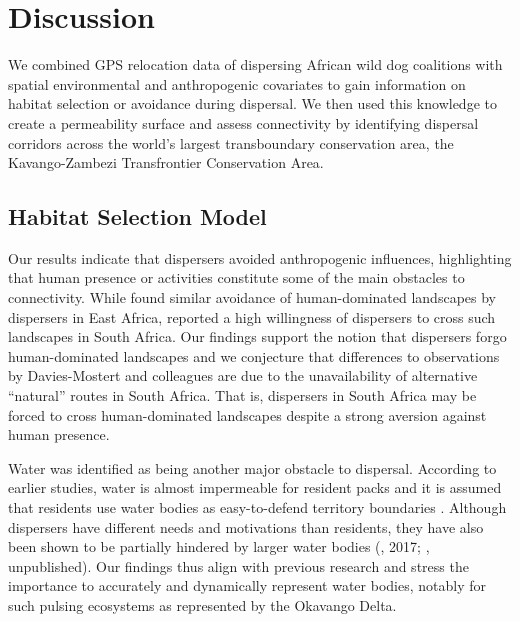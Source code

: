 \documentclass[abstract=on,10pt,a4paper,bibliography=totocnumbered]{scrartcl}
\begin{document}
\newpage
\section{Discussion}
\label{Discussion}
We combined GPS relocation data of dispersing African wild dog coalitions with
spatial environmental and anthropogenic covariates to gain information on
habitat selection or avoidance during dispersal. We then used this knowledge to
create a permeability surface and assess connectivity by identifying dispersal
corridors across the world’s largest transboundary conservation area, the
Kavango-Zambezi Transfrontier Conservation Area.

\subsection{Habitat Selection Model}
Our results indicate that dispersers avoided anthropogenic influences,
highlighting that human presence or activities constitute some of the main
obstacles to connectivity. While \cite{Masenga.2016} found similar avoidance of
human-dominated landscapes by dispersers in East Africa,
\cite{DaviesMostert.2012} reported a high willingness of dispersers to cross
such landscapes in South Africa. Our findings support the notion that dispersers
forgo human-dominated landscapes and we conjecture that differences to
observations by Davies-Mostert and colleagues are due to the unavailability of
alternative ``natural'' routes in South Africa. That is, dispersers in South
Africa may be forced to cross human-dominated landscapes despite a strong
aversion against human presence.

Water was identified as being another major obstacle to dispersal. According to
earlier studies, water is almost impermeable for resident packs and it is
assumed that residents use water bodies as easy-to-defend territory boundaries
\citep{Cozzi.2013}. Although dispersers have different needs and motivations
than residents, they have also been shown to be partially hindered by larger
water bodies (\citeauthor{Abrahms.2017}, 2017; \citeauthor{Cozzi.2020},
unpublished). Our findings thus align with previous research and stress the
importance to accurately and dynamically represent water bodies, notably for
such pulsing ecosystems as represented by the Okavango Delta.
\end{document}
